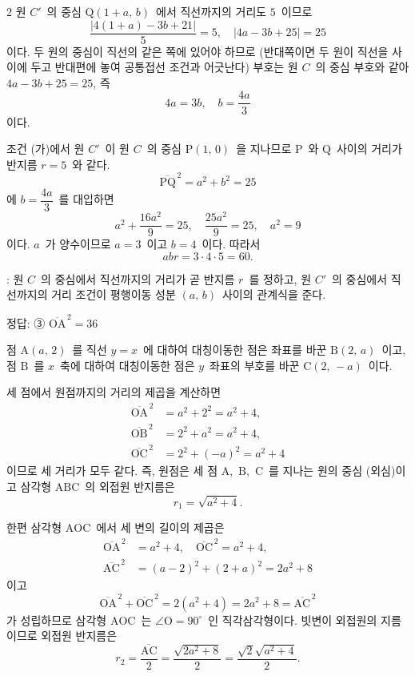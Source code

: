 \documentclass[10pt,fleqn]{article}
\begin{document}
\begin{multicols*}{2}
원 $C'$\ 의 중심 $\mathrm{Q}(1+a,\,b)$\ 에서 직선까지의 거리도 $5$\ 이므로
\[ \dfrac{|4(1+a)-3b+21|}{5} = 5,\quad |4a-3b+25| = 25 \]
이다. 두 원의 중심이 직선의 같은 쪽에 있어야 하므로 (반대쪽이면 두 원이 직선을 사이에 두고 반대편에 놓여 공통접선 조건과 어긋난다) 부호는 원 $C$\ 의 중심 부호와 같아 $4a-3b+25=25$, 즉
\[ 4a=3b,\quad b=\dfrac{4a}{3} \]
이다.

조건 (가)에서 원 $C'$\ 이 원 $C$\ 의 중심 $\mathrm{P}(1,\,0)$\ 을 지나므로 $\mathrm{P}$\ 와 $\mathrm{Q}$\ 사이의 거리가 반지름 $r=5$\ 와 같다.
\[ \overline{\mathrm{PQ}}^{\,2} = a^2+b^2 = 25 \]
에 $b=\dfrac{4a}{3}$\ 를 대입하면
\[ a^2 + \dfrac{16a^2}{9} = 25,\quad \dfrac{25a^2}{9} = 25,\quad a^2=9 \]
이다. $a$\ 가 양수이므로 $a=3$\ 이고 $b=4$\ 이다. 따라서
\[ abr = 3\cdot 4\cdot 5 = 60. \]

\begin{dmcriticalpoint}
: 원 $C$\ 의 중심에서 직선까지의 거리가 곧 반지름 $r$\ 를 정하고, 원 $C'$\ 의 중심에서 직선까지의 거리 조건이 평행이동 성분 $(a,\,b)$\ 사이의 관계식을 준다.
\end{dmcriticalpoint}

\begin{dmanswerbox}
정답: ③ $\overline{\mathrm{OA}}^{\,2}=36$
\end{dmanswerbox}

점 $\mathrm{A}(a,\,2)$\ 를 직선 $y=x$\ 에 대하여 대칭이동한 점은 좌표를 바꾼 $\mathrm{B}(2,\,a)$\ 이고, 점 $\mathrm{B}$\ 를 $x$\ 축에 대하여 대칭이동한 점은 $y$\ 좌표의 부호를 바꾼 $\mathrm{C}(2,\,-a)$\ 이다.

세 점에서 원점까지의 거리의 제곱을 계산하면
\begin{align*}
\overline{\mathrm{OA}}^{\,2} &= a^2+2^2 = a^2+4, \\
\overline{\mathrm{OB}}^{\,2} &= 2^2+a^2 = a^2+4, \\
\overline{\mathrm{OC}}^{\,2} &= 2^2+(-a)^2 = a^2+4
\end{align*}
이므로 세 거리가 모두 같다. 즉, 원점은 세 점 $\mathrm{A}$,\ $\mathrm{B}$,\ $\mathrm{C}$\ 를 지나는 원의 중심 (외심)이고 삼각형 $\mathrm{ABC}$\ 의 외접원 반지름은
\[ r_1 = \sqrt{a^2+4}. \]

한편 삼각형 $\mathrm{AOC}$\ 에서 세 변의 길이의 제곱은
\begin{align*}
\overline{\mathrm{OA}}^{\,2} &= a^2+4,\quad \overline{\mathrm{OC}}^{\,2} = a^2+4, \\
\overline{\mathrm{AC}}^{\,2} &= (a-2)^2+(2+a)^2 = 2a^2+8
\end{align*}
이고
\[ \overline{\mathrm{OA}}^{\,2}+\overline{\mathrm{OC}}^{\,2} = 2(a^2+4) = 2a^2+8 = \overline{\mathrm{AC}}^{\,2} \]
가 성립하므로 삼각형 $\mathrm{AOC}$\ 는 $\angle \mathrm{O}=90^{\circ}$\ 인 직각삼각형이다. 빗변이 외접원의 지름이므로 외접원 반지름은
\[ r_2 = \dfrac{\overline{\mathrm{AC}}}{2} = \dfrac{\sqrt{2a^2+8}}{2} = \dfrac{\sqrt{2}\sqrt{a^2+4}}{2}. \]


\end{multicols*}
\end{document}
